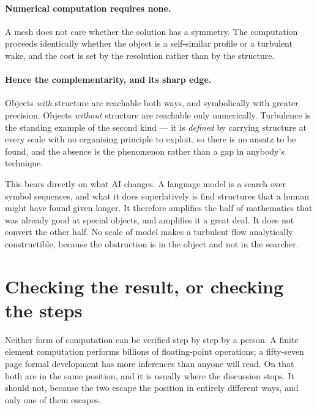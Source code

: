 \documentclass[11pt]{article}
\begin{document}
\paragraph{Numerical computation requires none.} A mesh does not care whether the solution has a
symmetry. The computation proceeds identically whether the object is a self-similar profile or a
turbulent wake, and the cost is set by the resolution rather than by the structure.

\paragraph{Hence the complementarity, and its sharp edge.} Objects \emph{with} structure are reachable
both ways, and symbolically with greater precision. Objects \emph{without} structure are reachable
only numerically. Turbulence is the standing example of the second kind --- it is \emph{defined} by
carrying structure at every scale with no organising principle to exploit, so there is no ansatz to
be found, and the absence is the phenomenon rather than a gap in anybody's technique.

This bears directly on what AI changes. A language model is a search over symbol sequences, and what
it does superlatively is find structures that a human might have found given longer. It therefore
amplifies the half of mathematics that was already good at special objects, and amplifies it a great
deal. It does not convert the other half. No scale of model makes a turbulent flow analytically
constructible, because the obstruction is in the object and not in the searcher.

\section{Checking the result, or checking the steps}\label{sec:check}

Neither form of computation can be verified step by step by a person. A finite element computation
performs billions of floating-point operations; a fifty-seven page formal development has more
inferences than anyone will read. On that both are in the same position, and it is usually where the
discussion stops. It should not, because the two escape the position in entirely different ways, and
only one of them escapes.
\end{document}
